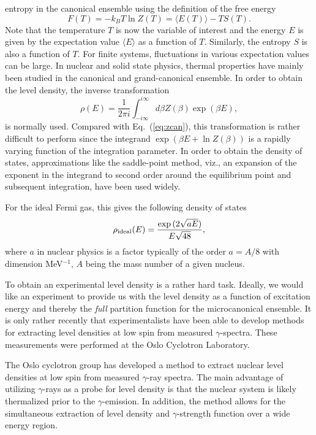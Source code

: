 \documentclass[%
oneside,                 %
final,                   %
10pt]{article}
\begin{document}
entropy in the canonical ensemble using the definition of the 
free energy 
\begin{equation}
     F(T)= -k_B T \ln Z(T)=\langle E(T)\rangle - TS(T).
\end{equation}
Note that the temperature $T$ is now the variable of 
interest and the energy $E$ is given by the expectation 
value $\langle E\rangle$ as a function of $T$. Similarly, 
the entropy $S$ is also a function of $T$.
For finite systems, fluctuations in various 
expectation values can be large.
In nuclear and solid state physics, thermal properties have 
mainly been studied in the canonical and grand-canonical ensemble. 
In order to obtain the level density, the inverse transformation 
\begin{equation}
      \rho(E) =\frac{1}{2\pi i}\int_{-i\infty}^{i\infty}
 d\beta Z(\beta) \exp{(\beta E)},
      \label{eq:zbigcan}
\end{equation}
is normally used. Compared with Eq.\ (\ref{eq:zcan}), this 
transformation is rather difficult to perform since 
the integrand $\exp{\left(\beta E+ \ln Z(\beta)\right)}$ is a 
rapidly varying function of the integration parameter. In order to obtain 
the density of states, approximations like the saddle-point 
method, viz., an expansion of the exponent in the integrand 
to second order around the equilibrium point and subsequent integration, 
have been used widely.

For the ideal Fermi gas, this gives the following density of states
\begin{equation}
      \rho_{\rm ideal}(E)=\frac{\exp{(2\sqrt{aE})}}{E\sqrt{48}},
      \label{eq:omegaideal}
\end{equation}
where $a$ in nuclear physics is a factor 
typically of the order $a=A/8$ with dimension 
MeV$^{-1}$, $A$ being the mass number of a given nucleus. 



To obtain an experimental level density is a rather hard task.
Ideally, we would like an experiment to provide us with the level 
density as a function of excitation energy and thereby 
the \emph{full} partition function for the microcanonical ensemble. 
It is only rather recently that 
experimentalists have been able to develop methods for extracting level densities at low spin from
measured $\gamma$-spectra. 
These measurements were performed at the Oslo 
Cyclotron Laboratory.

The Oslo cyclotron group has developed a method to 
extract nuclear level densities at low spin from 
measured $\gamma$-ray spectra.
The main advantage of utilizing $\gamma$-rays as a probe for 
level density is that the nuclear system is likely thermalized prior 
to the $\gamma$-emission. In addition, the method 
allows for the simultaneous extraction of level density 
and $\gamma$-strength function over a wide energy region. 
\end{document}
